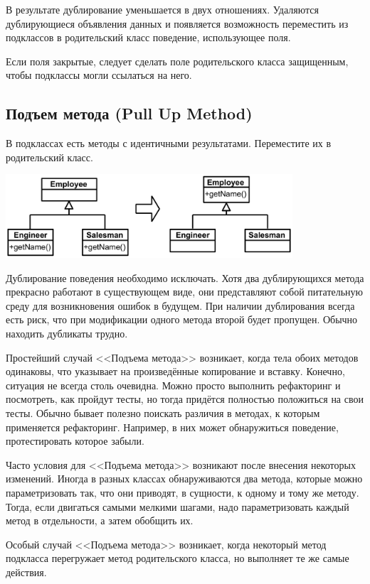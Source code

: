 \documentclass{../../text-style}
\begin{document}
В результате дублирование уменьшается в двух отношениях. Удаляются дублирующиеся объявления данных и появляется возможность переместить из подклассов в родительский класс поведение, использующее поля.

Если поля закрытые, следует сделать поле родительского класса защищенным, чтобы подклассы могли ссылаться на него.

\subsection{Подъем метода (Pull Up Method)}

В подклассах есть методы с идентичными результатами. Переместите их в родительский класс.

\begin{center}
    \includegraphics[width=0.8\textwidth]{pullUpMethod.png}
\end{center}

Дублирование поведения необходимо исключать. Хотя два дублирующихся метода прекрасно работают в существующем виде, они представляют собой питательную среду для возникновения ошибок в будущем. При наличии дублирования всегда есть риск, что при модификации одного метода второй будет пропущен. Обычно находить дубликаты трудно.

Простейший случай <<Подъема метода>> возникает, когда тела обоих методов одинаковы, что указывает на произведённые копирование и вставку. Конечно, ситуация не всегда столь очевидна. Можно просто выполнить рефакторинг и посмотреть, как пройдут тесты, но тогда придётся полностью положиться на свои тесты. Обычно бывает полезно поискать различия в методах, к которым применяется рефакторинг. Например, в них может обнаружиться поведение, протестировать которое забыли.

Часто условия для <<Подъема метода>> возникают после внесения некоторых изменений. Иногда в разных классах обнаруживаются два метода, которые можно параметризовать так, что они приводят, в сущности, к одному и тому же методу. Тогда, если двигаться самыми мелкими шагами, надо параметризовать каждый метод в отдельности, а затем обобщить их.

Особый случай <<Подъема метода>> возникает, когда некоторый метод подкласса перегружает метод родительского класса, но выполняет те же самые действия.
\end{document}
